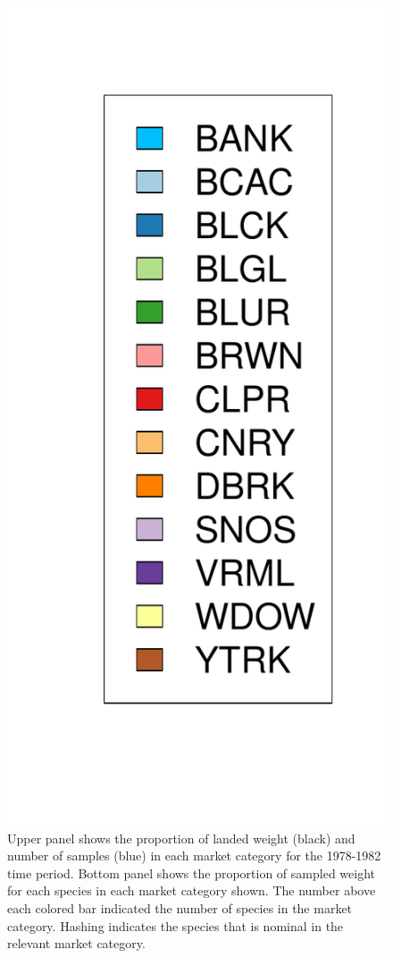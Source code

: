 \documentclass[12pt]{article}
\begin{document}
\begin{landscape}
\begin{figure}[h!]
\includegraphics[height=0.8\textheight]{./pictures/barplotLegend.pdf}
\caption{Upper panel shows the proportion of landed weight (black) and number of 
samples (blue) in each market category for the 1978-1982 time period. Bottom panel 
shows the proportion of sampled weight for each species in each market category 
shown. The number above each colored bar indicated the number of species in 
the market category. Hashing indicates the species that is nominal in the relevant 
market category.}
\label{bar78}
\end{figure}
\end{landscape}
\end{document}
